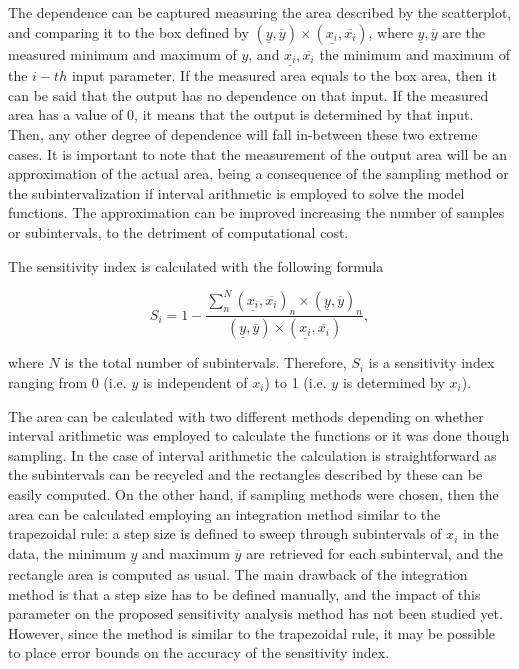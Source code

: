\documentclass[twocolumn]{rps-esrel2022}
\begin{document}
The dependence can be captured measuring the area described by the scatterplot, and comparing it to the box defined by $(\underline{y},\overline{y})\times(\underline{x_i},\overline{x_i})$,
where $\underline{y},\overline{y}$ are the measured minimum and maximum of $y$, and $\underline{x_i},\overline{x_i}$ the minimum and maximum of the $i-th$ input parameter.
If the measured area equals to the box area, then it can be said that the output has no dependence on that input.
If the measured area has a value of 0, it means that the output is determined by that input.
Then, any other degree of dependence will fall in-between these two extreme cases.
It is important to note that the measurement of the output area will be an approximation of the actual area, being a consequence of the sampling method or the subintervalization
if interval arithmetic is employed to solve the model functions.
The approximation can be improved increasing the number of samples or subintervals, to the detriment of computational cost.

The sensitivity index is calculated with the following formula

\begin{equation}
	S_i = 1 - \frac{\sum_n^N(\underline{x_i},\overline{x_i})_n\times(\underline{y},\overline{y})_n}{(\underline{y},\overline{y})\times(\underline{x_i},\overline{x_i})}{,}
\end{equation}

where $N$ is the total number of subintervals.
Therefore, $S_i$ is a sensitivity index ranging from 0 (i.e. $y$ is independent of $x_i$) to 1 (i.e. $y$ is determined by $x_i$).

The area can be calculated with two different methods depending on whether interval arithmetic was employed to calculate the functions or it was done though sampling.
In the case of interval arithmetic the calculation is straightforward as the subintervals can be recycled and the rectangles described by these can be easily computed.
On the other hand, if sampling methods were chosen, then the area can be calculated employing an integration method similar to the trapezoidal rule: a step size is defined to
sweep through subintervals of $x_i$ in the data, the minimum $\underline{y}$ and maximum $\overline{y}$ are retrieved for each subinterval, and the rectangle area is computed as usual.
The main drawback of the integration method is that a step size has to be defined manually, and the impact of this parameter on the proposed sensitivity analysis method has not
been studied yet.
However, since the method is similar to the trapezoidal rule, it may be possible to place error bounds on the accuracy of the sensitivity index.
\end{document}
